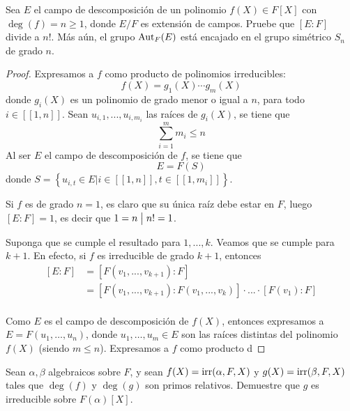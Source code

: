 \documentclass[12pt]{report}
\theoremstyle{largebreak}
\newcommand\divides{\ensuremath{\bigm|}}
\newcommand\irr{\textup{irr}}
\newcommand\natint[1]{\ensuremath{\left[\!\left[ #1\right]\!\right]}}
\begin{document}
\begin{excer}
    Sea $E$ el campo de descomposición de un polinomio $f(X)\in F[X]$ con $\deg(f)=n\geq1$, donde $E/F$ es extensión de campos. Pruebe que $[E:F]$ divide a $n!$. Más aún, el grupo $\textup{Aut}_F(E)$ está encajado en el grupo simétrico $S_n$ de grado $n$.
\end{excer}

\begin{proof}
    Expresamos a $f$ como producto de polinomios irreducibles:
    \begin{equation*}
        f(X)=g_1(X)\cdots g_m(X)
    \end{equation*}
    donde $g_i(X)$ es un polinomio de grado menor o igual a $n$, para todo $i\in\natint{1,n}$. Sean $u_{i,1},...,u_{i,m_i}$ las raíces de $g_i(X)$, se tiene que
    \begin{equation*}
        \sum_{ i=1}^m m_i\leq n
    \end{equation*}
    Al ser $E$ el campo de descomposición de $f$, se tiene que
    \begin{equation*}
        E=F(S)
    \end{equation*}
    donde $S=\left\{u_{ i,t}\in E\Big|i\in\natint{1,n}, t\in\natint{1,m_i}\right\}$.

    Si $f$ es de grado $n=1$, es claro que su única raíz debe estar en $F$, luego $[E:F]=1$, es decir que $1=n\divides n!=1$.

    Suponga que se cumple el resultado para $1,...,k$. Veamos que se cumple para $k+1$. En efecto, si $f$ es irreducible de grado $k+1$, entonces
    \begin{equation*}
        \begin{split}
            [E:F]&=[F(v_1,...,v_{ k+1}):F]\\
            &=[F(v_1,...,v_{ k+1}):F(v_1,...,v_{ k})]\cdot...\cdot[F(v_1):F]\\
        \end{split}
    \end{equation*}

    Como $E$ es el campo de descomposición de $f(X)$, entonces expresamos a $E=F\left(u_1,\dots,u_n\right)$, donde $u_1,\dots,u_m\in E$ son las raíces distintas del polinomio $f(X)$ (siendo $m\leq n$). Expresamos a $f$ como producto d 
\end{proof}

\begin{excer}
    Sean $\alpha, \beta$ algebraicos sobre $F$, y sean $f(X)=\irr(\alpha, F, X)$ y $g(X)=\irr(\beta, F, X)$ tales que $\deg(f)$ y $\deg(g)$ son primos relativos. Demuestre que $g$ es irreducible sobre $F(\alpha)[X]$.
\end{excer}
\end{document}
